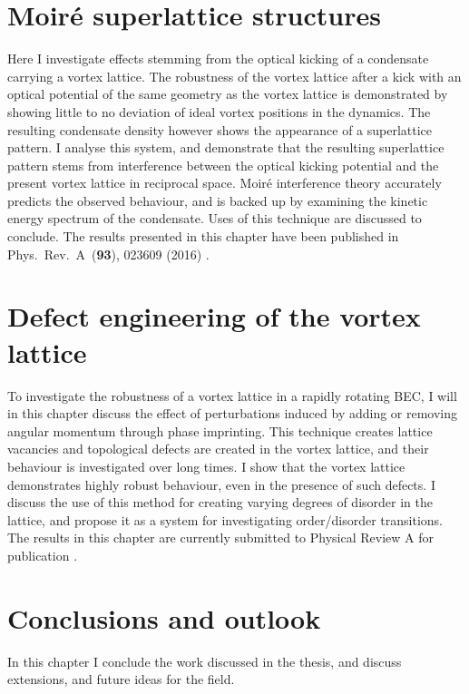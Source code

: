 \section{Moir\'e superlattice structures}
Here I investigate effects stemming from the optical kicking of a condensate carrying a vortex lattice. The robustness of the vortex lattice after a kick with an optical potential of the same geometry as the vortex lattice is demonstrated by showing little to no deviation of ideal vortex positions in the dynamics. The resulting condensate density however shows the appearance of a superlattice pattern. I analyse this system, and demonstrate that the resulting superlattice pattern stems from interference between the optical kicking potential and the present vortex lattice in reciprocal space. Moir\'e interference theory accurately predicts the observed behaviour, and is backed up by examining the kinetic energy spectrum of the condensate. Uses of this technique are discussed to conclude. The results presented in this chapter have been published in Phys.~Rev.~A~(\textbf{93}), 023609 (2016) \cite{VTX:oriordan_pra_2016}.

\section{Defect engineering of the vortex lattice}
To investigate the robustness of a vortex lattice in a rapidly rotating BEC, I will in this chapter discuss the effect of perturbations induced by adding or removing angular momentum through phase imprinting. This technique creates lattice vacancies and topological defects are created in the vortex lattice, and their behaviour is investigated over long times. I show that the vortex lattice demonstrates highly robust behaviour, even in the presence of such defects. I discuss the use of this method for creating varying degrees of disorder in the lattice, and propose it as a system for investigating order/disorder transitions. The results in this chapter are currently submitted to Physical Review A for publication \cite{ME:arxiv_defect}.

\section{Conclusions and outlook}
In this chapter I conclude the work discussed in the thesis, and discuss extensions, and future ideas for the field.
